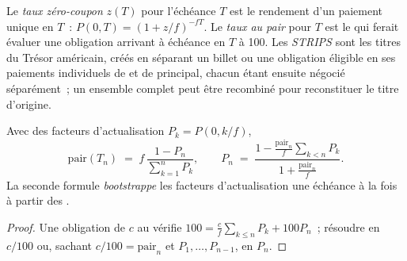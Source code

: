 \begin{definition}\label{def:m2:government-bonds:zero}
Le \emph{taux zéro-coupon} $z(T)$ pour l'échéance $T$
est le rendement d'un paiement unique en $T$~: $P(0,T) = (1 + z/f)^{-fT}$. Le
\emph{taux au pair} pour $T$ est le  qui ferait évaluer une
obligation arrivant à échéance en $T$ à 100. Les \emph{STRIPS} sont les titres
 du Trésor américain, créés en séparant un billet ou une
obligation éligible en ses paiements individuels de  et de principal, chacun étant ensuite
négocié séparément~; un ensemble complet peut être recombiné pour reconstituer
le titre d'origine.
\end{definition}

\begin{proposition}\label{prop:m2:government-bonds:par}
Avec des facteurs d'actualisation $P_k = P(0, k/f)$,
\[
\text{pair}(T_n) \;=\; f\,\frac{1 - P_n}{\sum_{k=1}^n P_k},
\qquad
P_n \;=\; \frac{1 - \frac{\text{pair}_n}{f}\sum_{k<n} P_k}{1 + \frac{\text{pair}_n}{f}} .
\]
La seconde formule \emph{bootstrappe} les facteurs d'actualisation une échéance à la fois
à partir des .
\end{proposition}
\begin{proof}
Une obligation de  $c$ au  vérifie $100 = \frac cf \sum_{k \le n} P_k +
100 P_n$~; résoudre en $c/100$ ou, sachant $c/100 = \text{pair}_n$ et $P_1, \dots,
P_{n-1}$, en $P_n$.
\end{proof}

